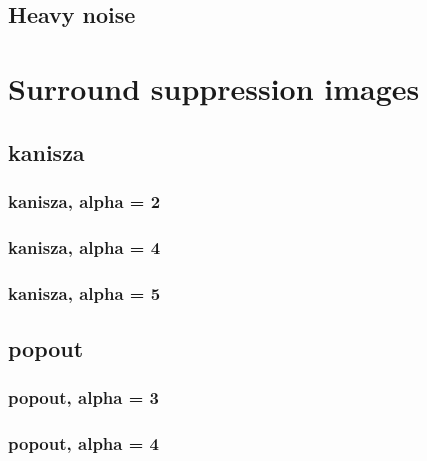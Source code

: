 \documentclass[10pt,a4paper]{article}
\begin{document}
\subsection{Heavy noise}


\section{Surround suppression images}
\subsection{kanisza}

\subsubsection{kanisza, alpha = 2}

\subsubsection{kanisza, alpha = 4}

\subsubsection{kanisza, alpha = 5}


\subsection{popout}

\subsubsection{popout, alpha = 3}

\subsubsection{popout, alpha = 4}

\end{document}
